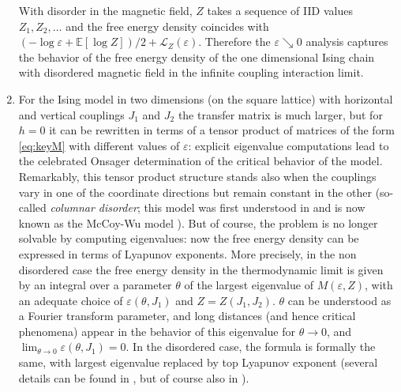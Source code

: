 \documentclass[reqno,11pt]{amsart}
\numberwithin{equation}{section}
\newcommand{\cL}{{\ensuremath{\mathcal L}} }
\newcommand{\bbE}{{\ensuremath{\mathbb E}} }
\newcommand{\gep}{\varepsilon}       %
\begin{document}
\begin{enumerate}[start=1,label={(I\arabic*)},leftmargin=*]
With disorder in the magnetic field, $Z$ takes a sequence of IID values $Z_1,Z_2,\dots $ and the free energy density  coincides with $(-\log \gep + \bbE[\log Z])/2+\cL_Z(\gep)$. Therefore the $\gep\searrow 0$ analysis captures the behavior of the free energy density of the one dimensional Ising chain with disordered magnetic field in the infinite coupling interaction limit.
\item	\label{Is2} For the Ising model in two dimensions (on the square lattice) with horizontal and vertical couplings $J_1$ and $J_2$ the transfer matrix is much larger, but for $h=0$ it can be rewritten in terms of a tensor product of matrices of the form \eqref{eq:keyM} with different values of $\gep$: explicit eigenvalue computations lead to the celebrated Onsager determination of the critical behavior of the model. 
Remarkably, this tensor product structure stands also when  the couplings vary in one of the coordinate directions but remain constant in the other (so-called \emph{columnar disorder}; this model was first understood in \cite{cf:MW} and is now known as the McCoy-Wu model \cite{cf:MW,cf:MWbook,cf:SM}). But of course, the problem is no longer solvable by computing eigenvalues: now the free energy density can be expressed in terms of Lyapunov exponents. More precisely, 
	in the non disordered case the free energy density in the thermodynamic limit is given by an integral over a parameter $\theta$ of the largest eigenvalue of $M( \varepsilon, Z)$, with an adequate choice of $\gep(\theta, J_1)$ and $Z=Z(J_1, J_2)$.
	$\theta$ can be understood as a Fourier transform parameter, and long distances (and hence critical phenomena) appear in the behavior of this eigenvalue for $\theta \to 0$, and  $\lim_{\theta \to 0}\gep(\theta, J_1)=0$. 
	In the disordered case, the formula is formally the same, with largest eigenvalue replaced by top Lyapunov exponent 
	 (several details can be found in \cite[Appendix~A]{cf:CGG}, but of course also in \cite{cf:MW,cf:MWbook,cf:SM}). 

\end{enumerate}
\end{document}
